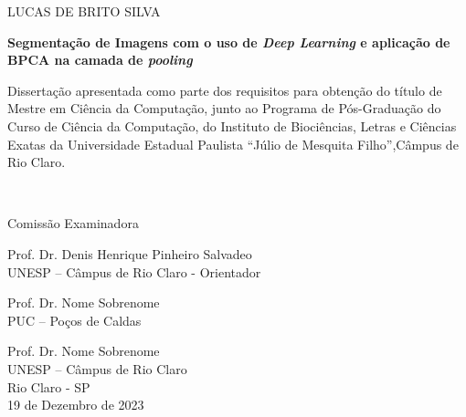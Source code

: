 \newpage
\thispagestyle{empty}

\begin{center}
    {LUCAS DE BRITO SILVA\\}
    
    \vspace{2cm}
    
    \textbf{Segmentação de Imagens com o uso de \textit{Deep Learning} e aplicação de BPCA na camada de \textit{pooling}}
    
    \vspace{4cm}
    
    \hspace{.45\linewidth}
    \begin{minipage}{.50\linewidth}
    \small
        Dissertação apresentada como parte dos requisitos para obtenção do título de Mestre em Ciência da Computação, junto ao Programa de Pós-Graduação do Curso de Ciência da Computação, do Instituto de Biociências, Letras e Ciências Exatas da Universidade Estadual Paulista “Júlio de Mesquita Filho”,Câmpus de Rio Claro.
    \end{minipage} \\
    \normalsize
    
    \vspace{1cm}
    
    Comissão Examinadora\\
    
    \vspace{1cm}

    Prof. Dr. Denis Henrique Pinheiro Salvadeo\\
    UNESP – Câmpus de Rio Claro - Orientador\\
    \vspace{0.5cm}


    Prof. Dr. Nome Sobrenome\\
    PUC – Poços de Caldas\\
    \vspace{0.5cm}


    Prof. Dr. Nome Sobrenome\\
    UNESP – Câmpus de Rio Claro \\

    
    \vspace{2cm}
    Rio Claro - SP \\
    19 de Dezembro de 2023
\end{center}